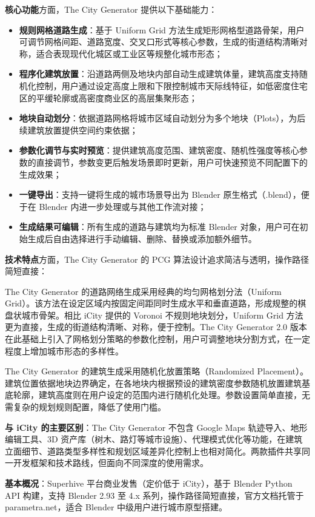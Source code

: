 \documentclass[UTF8,a4paper,10pt]{ctexart}
\begin{document}
\textbf{核心功能}方面，The City Generator 提供以下基础能力：
\begin{itemize}
    \item \textbf{规则网格道路生成}：基于 Uniform Grid 方法生成矩形网格型道路骨架，用户可调节网格间距、道路宽度、交叉口形式等核心参数，生成的街道结构清晰对称，适合表现现代化城区或工业区等规整化城市形态；
    \item \textbf{程序化建筑放置}：沿道路两侧及地块内部自动生成建筑体量，建筑高度支持随机化控制，用户通过设定高度上限和下限控制城市天际线特征，如低密度住宅区的平缓轮廓或高密度商业区的高层集聚形态；
    \item \textbf{地块自动划分}：依据道路网格将城市区域自动划分为多个地块（Plots），为后续建筑放置提供空间约束依据；
    \item \textbf{参数化调节与实时预览}：提供建筑高度范围、建筑密度、随机性强度等核心参数的直接调节，参数变更后触发场景即时更新，用户可快速预览不同配置下的生成效果；
    \item \textbf{一键导出}：支持一键将生成的城市场景导出为 Blender 原生格式（.blend），便于在 Blender 内进一步处理或与其他工作流对接；
    \item \textbf{生成结果可编辑}：所有生成的道路与建筑均为标准 Blender 对象，用户可在初始生成后自由选择进行手动编辑、删除、替换或添加额外细节。
\end{itemize}

\textbf{技术特点}方面，The City Generator 的 PCG 算法设计追求简洁与透明，操作路径简短直接：

The City Generator 的道路网络生成采用经典的均匀网格划分法（Uniform Grid）。该方法在设定区域内按固定间距同时生成水平和垂直道路，形成规整的棋盘状城市骨架。相比 iCity 提供的 Voronoi 不规则地块划分，Uniform Grid 方法更为直接，生成的街道结构清晰、对称，便于控制。The City Generator 2.0 版本在此基础上引入了网格划分策略的参数化控制，用户可调整地块分割方式，在一定程度上增加城市形态的多样性。

The City Generator 的建筑生成采用随机化放置策略（Randomized Placement）。建筑位置依据地块边界确定，在各地块内根据预设的建筑密度参数随机放置建筑基底轮廓，建筑高度则在用户设定的范围内进行随机化处理。参数设置简单直接，无需复杂的规划规则配置，降低了使用门槛。

\textbf{与 iCity 的主要区别}：The City Generator 不包含 Google Maps 轨迹导入、地形编辑工具、3D 资产库（树木、路灯等城市设施）、代理模式优化等功能，在建筑立面细节、道路类型多样性和规划区域差异化控制上也相对简化。两款插件共享同一开发框架和技术路线，但面向不同深度的使用需求。

\textbf{基本概况}：Superhive 平台商业发售（定价低于 iCity），基于 Blender Python API 构建，支持 Blender 2.93 至 4.x 系列，操作路径简短直接，官方文档托管于 parametra.net，适合 Blender 中级用户进行城市原型搭建。
\end{document}
